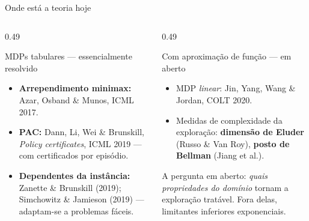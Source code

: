 \documentclass[aspectratio=169, 11pt]{beamer}
\begin{document}
\begin{frame}{Onde está a teoria hoje}
  \begin{columns}[T]
    \begin{column}{0.49\textwidth}
      \begin{teobox}{MDPs tabulares --- essencialmente resolvido}
        \begin{itemize}
          \item \textbf{Arrependimento minimax:} Azar, Osband \& Munos, ICML 2017.
          \item \textbf{PAC:} Dann, Li, Wei \& Brunskill, \textit{Policy certificates},
                ICML 2019 --- com certificados por episódio.
          \item \textbf{Dependentes da instância:} Zanette \& Brunskill (2019);
                Simchowitz \& Jamieson (2019) --- adaptam-se a problemas fáceis.
        \end{itemize}
      \end{teobox}
    \end{column}
    \begin{column}{0.49\textwidth}
      \begin{teobox}{Com aproximação de função --- em aberto}
        \begin{itemize}
          \item MDP \emph{linear}: Jin, Yang, Wang \& Jordan, COLT 2020.
          \item Medidas de complexidade da exploração: \textbf{dimensão de Eluder}
                (Russo \& Van Roy), \textbf{posto de Bellman} (Jiang et al.).
        \end{itemize}
      \end{teobox}
      \begin{alertabox}
        A pergunta em aberto: \emph{quais propriedades do domínio} tornam a exploração
        tratável. Fora delas, limitantes inferiores exponenciais.
      \end{alertabox}
    \end{column}
  \end{columns}
\end{frame}
\end{document}
